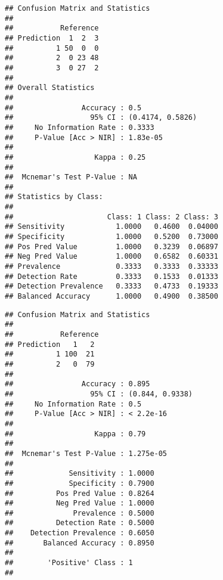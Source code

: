 \documentclass[
]{article}
\newenvironment{Shaded}{\begin{snugshade}}{\end{snugshade}}
\newcommand{\FunctionTok}[1]{\textcolor[rgb]{0.13,0.29,0.53}{\textbf{#1}}}
\newcommand{\NormalTok}[1]{#1}
\newcommand{\SpecialCharTok}[1]{\textcolor[rgb]{0.81,0.36,0.00}{\textbf{#1}}}
\begin{document}
\begin{verbatim}
## Confusion Matrix and Statistics
## 
##           Reference
## Prediction  1  2  3
##          1 50  0  0
##          2  0 23 48
##          3  0 27  2
## 
## Overall Statistics
##                                           
##                Accuracy : 0.5             
##                  95% CI : (0.4174, 0.5826)
##     No Information Rate : 0.3333          
##     P-Value [Acc > NIR] : 1.83e-05        
##                                           
##                   Kappa : 0.25            
##                                           
##  Mcnemar's Test P-Value : NA              
## 
## Statistics by Class:
## 
##                      Class: 1 Class: 2 Class: 3
## Sensitivity            1.0000   0.4600  0.04000
## Specificity            1.0000   0.5200  0.73000
## Pos Pred Value         1.0000   0.3239  0.06897
## Neg Pred Value         1.0000   0.6582  0.60331
## Prevalence             0.3333   0.3333  0.33333
## Detection Rate         0.3333   0.1533  0.01333
## Detection Prevalence   0.3333   0.4733  0.19333
## Balanced Accuracy      1.0000   0.4900  0.38500
\end{verbatim}

\begin{Shaded}
\end{Shaded}

\begin{verbatim}
## Confusion Matrix and Statistics
## 
##           Reference
## Prediction   1   2
##          1 100  21
##          2   0  79
##                                          
##                Accuracy : 0.895          
##                  95% CI : (0.844, 0.9338)
##     No Information Rate : 0.5            
##     P-Value [Acc > NIR] : < 2.2e-16      
##                                          
##                   Kappa : 0.79           
##                                          
##  Mcnemar's Test P-Value : 1.275e-05      
##                                          
##             Sensitivity : 1.0000         
##             Specificity : 0.7900         
##          Pos Pred Value : 0.8264         
##          Neg Pred Value : 1.0000         
##              Prevalence : 0.5000         
##          Detection Rate : 0.5000         
##    Detection Prevalence : 0.6050         
##       Balanced Accuracy : 0.8950         
##                                          
##        'Positive' Class : 1              
## 
\end{verbatim}
\end{document}
